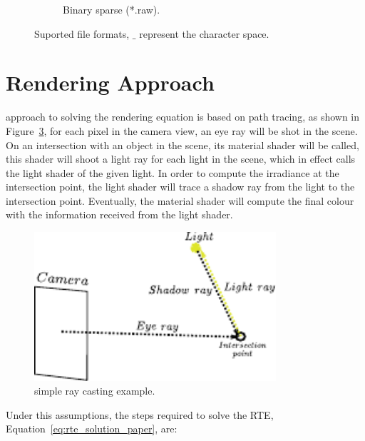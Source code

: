 \begin{figure}[htpb!]
\begin{subfigure}[t]{0.2256\textwidth}
                \caption{Binary sparse (*.raw).}
                \label{fig:file_format_binary}
        \end{subfigure}
        \caption{Suported file formats, $\_$ represent the character space.}
        \label{fig:file_format}
\end{figure}

\section{\MentalRay Rendering Approach}
\label{sec:mental_ray_rendering_approach}

\MentalRay approach to solving the rendering equation is based on path tracing, as shown in Figure~\ref{fig:mental_ray_model}, for each pixel in the camera view, an eye ray will be shot in the scene.
On an intersection with an object in the scene, its material shader will be called, this shader will shoot a light ray for each light in the scene, which in effect calls the light shader of the given light.
In order to compute the irradiance at the intersection point, the light shader will trace a shadow ray from the light to the intersection point.
Eventually, the material shader will compute the final colour with the information received from the light shader. 

\begin{figure}[htbp!]
\centering
\includegraphics[width=0.8\textwidth]{img/mental_ray_model}
	\caption{\MentalRay simple ray casting example.}
	\label{fig:mental_ray_model}
\end{figure}

Under this assumptions, the steps required to solve the RTE, Equation~\ref{eq:rte_solution_paper}, are:


